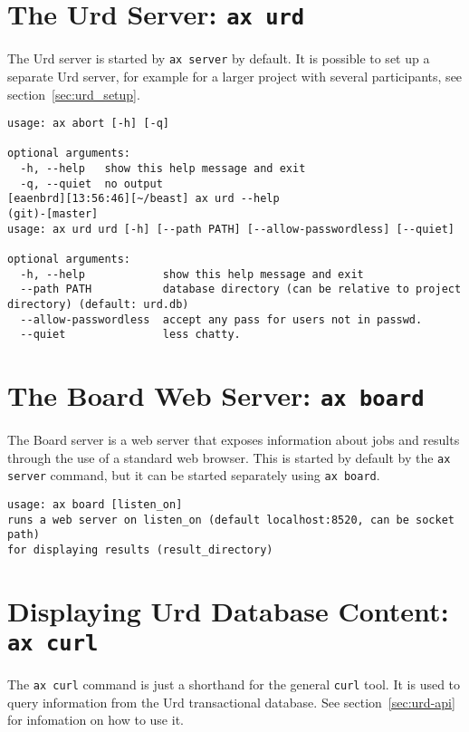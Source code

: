 \section{The Urd Server: \texttt{ax urd}}
The Urd server is started by \texttt{ax server} by default.  It is
possible to set up a separate Urd server, for example for a larger
project with several participants, see section~\ref{sec:urd_setup}.
\begin{snugshade}
\begin{verbatim}
usage: ax abort [-h] [-q]

optional arguments:
  -h, --help   show this help message and exit
  -q, --quiet  no output
[eaenbrd][13:56:46][~/beast] ax urd --help                                                                                                                                                                                                     (git)-[master] 
usage: ax urd urd [-h] [--path PATH] [--allow-passwordless] [--quiet]

optional arguments:
  -h, --help            show this help message and exit
  --path PATH           database directory (can be relative to project directory) (default: urd.db)
  --allow-passwordless  accept any pass for users not in passwd.
  --quiet               less chatty.
\end{verbatim}
\end{snugshade}


\section{The Board Web Server: \texttt{ax board}}
The Board server is a web server that exposes information about jobs
and results through the use of a standard web browser.  This is
started by default by the \texttt{ax server} command, but it can be
started separately using \texttt{ax board}.
\begin{snugshade}
\begin{verbatim}
usage: ax board [listen_on]
runs a web server on listen_on (default localhost:8520, can be socket path)
for displaying results (result_directory)
\end{verbatim}
\end{snugshade}


\section{Displaying Urd Database Content: \texttt{ax curl}}
The \texttt{ax curl} command is just a shorthand for the general
\texttt{curl} tool.  It is used to query information from the Urd
transactional database.  See section~\ref{sec:urd-api} for infomation
on how to use it.
